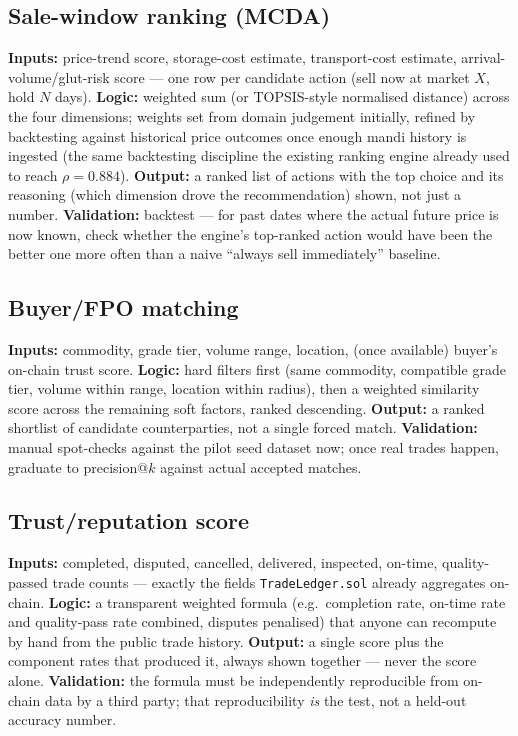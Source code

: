 \documentclass[11pt]{article}
\begin{document}
\subsection*{Sale-window ranking (MCDA)}
\textbf{Inputs:} price-trend score, storage-cost estimate, transport-cost estimate, arrival-volume/glut-risk
score --- one row per candidate action (sell now at market $X$, hold $N$ days). \textbf{Logic:} weighted sum
(or TOPSIS-style normalised distance) across the four dimensions; weights set from domain judgement
initially, refined by backtesting against historical price outcomes once enough mandi history is ingested
(the same backtesting discipline the existing ranking engine already used to reach $\rho = 0.884$).
\textbf{Output:} a ranked list of actions with the top choice and its reasoning (which dimension drove the
recommendation) shown, not just a number. \textbf{Validation:} backtest --- for past dates where the actual
future price is now known, check whether the engine's top-ranked action would have been the better one more
often than a naive ``always sell immediately'' baseline.

\subsection*{Buyer/FPO matching}
\textbf{Inputs:} commodity, grade tier, volume range, location, (once available) buyer's on-chain trust
score. \textbf{Logic:} hard filters first (same commodity, compatible grade tier, volume within range,
location within radius), then a weighted similarity score across the remaining soft factors, ranked
descending. \textbf{Output:} a ranked shortlist of candidate counterparties, not a single forced match.
\textbf{Validation:} manual spot-checks against the pilot seed dataset now; once real trades happen,
graduate to precision@$k$ against actual accepted matches.

\subsection*{Trust/reputation score}
\textbf{Inputs:} completed, disputed, cancelled, delivered, inspected, on-time, quality-passed trade counts
--- exactly the fields \texttt{TradeLedger.sol} already aggregates on-chain. \textbf{Logic:} a transparent
weighted formula (e.g.\ completion rate, on-time rate and quality-pass rate combined, disputes penalised) that
anyone can recompute by hand from the public trade history. \textbf{Output:} a single score plus the
component rates that produced it, always shown together --- never the score alone. \textbf{Validation:}
the formula must be independently reproducible from on-chain data by a third party; that reproducibility
\emph{is} the test, not a held-out accuracy number.
\end{document}
